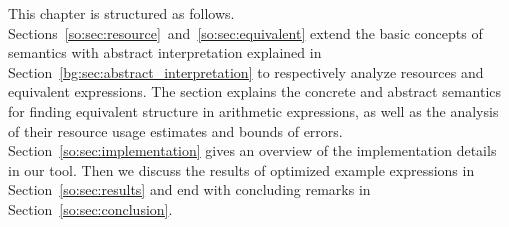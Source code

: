 This chapter is structured as follows.
Sections~\ref{so:sec:resource}~and~\ref{so:sec:equivalent} extend the
basic concepts of semantics with abstract interpretation explained in
Section~\ref{bg:sec:abstract_interpretation} to respectively analyze resources
and equivalent expressions.  The section explains the concrete and abstract
semantics for finding equivalent structure in arithmetic expressions, as
well as the analysis of their resource usage estimates and bounds of errors.
Section~\ref{so:sec:implementation} gives an overview of the implementation
details in our tool. Then we discuss the results of optimized example
expressions in Section~\ref{so:sec:results} and end with concluding remarks in
Section~\ref{so:sec:conclusion}.
